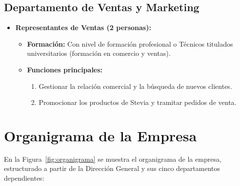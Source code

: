 \subsection{Departamento de Ventas y Marketing}
\begin{itemize}[leftmargin=*]
    \item \textbf{Representantes de Ventas (2 personas):}
          \begin{itemize}
              \item \textbf{Formación:} Con nivel de formación profesional o Técnicos titulados universitarios (formación en comercio y ventas).
              \item \textbf{Funciones principales:}
                    \begin{enumerate}
                        \item Gestionar la relación comercial y la búsqueda de nuevos clientes.
                        \item Promocionar los productos de Stevia y tramitar pedidos de venta.
                    \end{enumerate}
          \end{itemize}
\end{itemize}

\section{Organigrama de la Empresa}

En la Figura~\ref{fig:organigrama} se muestra el organigrama de la empresa, estructurado a partir de la Dirección General y sus cinco departamentos dependientes:


